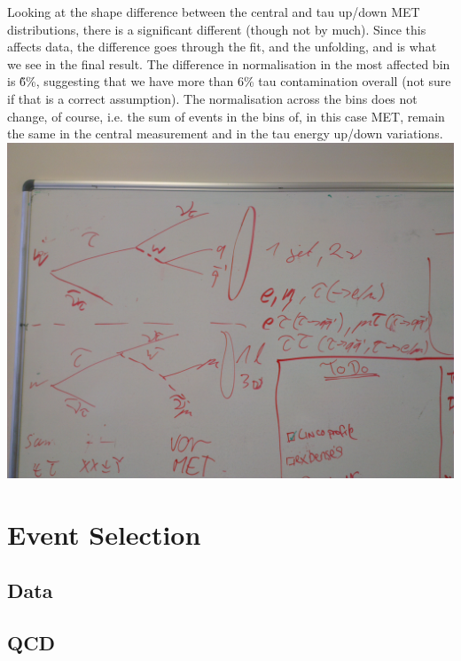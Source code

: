Looking at the shape difference between the central and tau up/down MET distributions, there is a significant
different (though not by much). Since this affects data, the difference goes through the fit, and the
unfolding, and is what we see in the final result. The difference in normalisation in the most affected bin is
\~6\%, suggesting that we have more than 6\% tau contamination overall (not sure if that is a correct
assumption). The normalisation across the bins does not change, of course, i.e. the sum of events in the bins
of, in this case MET, remain the same in the central measurement and in the tau energy up/down variations.
\includegraphics[width=\textwidth]{Chapters/04_Analysis/04b_XSections/Images/IMG_20150219_160840.jpg}

\section{Event Selection}
\label{s:event_selection}

\subsection{Data}
\label{ss:data_selection}

\subsection{QCD}
\label{ss:qcd_selection}
